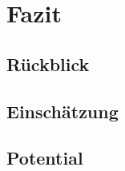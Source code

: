 \clearpage

\section{Fazit}
\label{sec:fazit}



\subsection{Rückblick}
\label{subsec:ruckblick}

\subsection{Einschätzung}
\label{subsec:einschatzung}

\subsection{Potential}
\label{subsec:potential}



